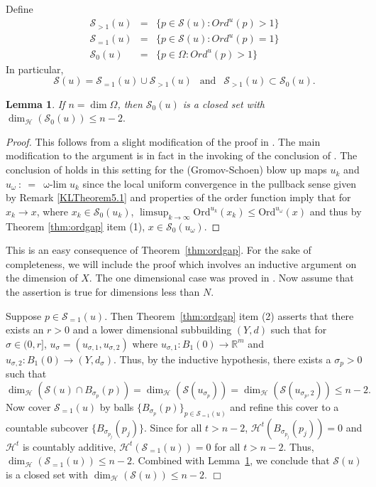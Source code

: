 \documentclass[12pt]{amsart}
\newtheorem{lemma}[theorem]{Lemma}
\theoremstyle{definition}
\newenvironment{proof1}
{{\it Proof of  Theorem~\ref{maintechnical}.}}
{\hfill $\Box$ \\}
\numberwithin{equation}{section}
\newcommand{\R}{\mathbb R}
\newcommand\wlim{\mathop{\mbox{$\omega$-$\lim$}}}
\begin{document}
Define
\begin{eqnarray*}
{\mathcal S}_{>1}(u) & = & \{p \in \mathcal S(u):  Ord^u(p) >1\}
\\
{\mathcal S}_{=1}(u) & = & \{p \in \mathcal S(u):  Ord^u(p)=1\}
\\
{\mathcal S}_0(u)  & = &  \{p \in \Omega:  Ord^u(p) >1\}
\end{eqnarray*}
In particular,
\[
\mathcal S(u)=\mathcal S_{=1}(u) \cup \mathcal S_{>1}(u) \ \ \mbox{ and } \ \ \mathcal S_{>1}(u) \subset \mathcal S_0(u).
\]
\begin{lemma} \label{higherorderpoints}
If $n=\dim \Omega$, then {${\mathcal S}_0(u)$ is a closed set with}
$
\dim_{\mathcal H}({\mathcal S}_0(u)) \leq n-2.
$
\end{lemma}

\begin{proof}
This follows from a slight modification of the proof in \cite[paragraph after Lemma 6.5]{gromov-schoen}. The main modification to the argument is in fact in the invoking of the conclusion of \cite[Lemma 6.5]{gromov-schoen}. The conclusion of \cite[Lemma 6.5]{gromov-schoen} holds in this setting for the (Gromov-Schoen) blow up maps $u_k$ and $u_\omega~:~=~\wlim u_k$ since the local uniform convergence in the pullback sense given by Remark \ref{KLTheorem5.1} and properties of the order function imply that for $x_k \to x$, where $x_k \in \mathcal S_0(u_k)$, $\limsup_{k \to \infty} \text{Ord}^{u_k}(x_k) \leq \text{Ord}^{u_\omega}(x)$ and thus by Theorem \ref{thm:ordgap} item (1), $x \in \mathcal S_0(u_\omega)$. 
\end{proof}


\begin{proof1}
This is an easy consequence of Theorem~\ref{thm:ordgap}.  For the sake of completeness, we will include the proof which  involves  an inductive argument on the dimension of $X$.  The one dimensional case was proved in  \cite{sun}.  Now assume that the assertion is true for dimensions less than $N$.  

Suppose $p \in \mathcal S_{=1}(u)$. Then Theorem~\ref{thm:ordgap} item (2) asserts that there exists an $r>0$ and a lower dimensional subbuilding $(Y,d)$ such that for $\sigma \in (0,r]$, $u_\sigma=(u_{\sigma, 1}, u_{\sigma, 2})$ where  $u_{\sigma, 1}:B_1(0) \to \R^m$ and $u_{\sigma, 2}: B_1(0) \to (Y,d_\sigma)$.  Thus, by the inductive hypothesis, there exists a $\sigma_p>0$ such that
$$
\dim_{\mathcal H}(\mathcal S(u) \cap B_{\sigma_p}(p))=\dim_{\mathcal H}(\mathcal S(u_{\sigma_p})) = \dim_{\mathcal H}(\mathcal S(u_{\sigma_p, 2})) \leq n-2.
$$
 Now cover $\mathcal S_{=1}(u)$ by balls $\{B_{\sigma_p}(p)\}_{p \in \mathcal S_{=1}(u)}$ and refine this cover to a countable subcover $\{B_{\sigma_{p_j}}(p_j)\}$. Since for all $t>n-2$, $\mathcal H^t(B_{\sigma_{p_j}}(p_j))= 0$ and $\mathcal H^t$ is countably additive,  $\mathcal H^t(\mathcal S_{=1}(u))=0$  for all $t>n-2$. Thus, $\dim_{\mathcal H}(\mathcal S_{=1}(u)) \leq n-2$.  Combined with Lemma~\ref{higherorderpoints}, we conclude {that $\mathcal S(u)$ is a closed set with} $\dim_{\mathcal H}(\mathcal S(u)) \leq n-2$.
\end{proof1}
\end{document}
